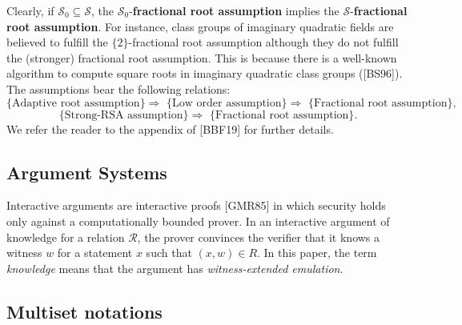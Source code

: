 \documentclass[11pt, lettersize, notitlepage, leqno, footskip=0.6cm]{article}
\newcommand{\imp}{\Longrightarrow}
\newcommand{\mc}{\mathcal}
\newcommand{\sub}{\subseteq}
\newcommand{\vs}{\vspace{-0.15cm}}
\newcommand{\noin}{\noindent}
\newtheorem{Def}{Definition}[section]
\numberwithin{equation}{section}
\begin{document}
Clearly, if $\mc{S}_0\sub \mc{S}$, the $\mc{S}_0$-\textbf{fractional root assumption} implies the $\mc{S}$-\textbf{fractional root assumption}. For instance, class groups of imaginary quadratic fields are believed to fulfill the $\{2\}$-fractional root assumption although they do not fulfill the (stronger) fractional root assumption. This is because there is a well-known algorithm to compute square roots in imaginary quadratic class groups ([BS96]). The assumptions bear the following relations: \vs $$\text{\{Adaptive root assumption\} }\imp \text{ \{Low order assumption\} } \imp \text{ \{Fractional root assumption\} },$$ \vspace{-0.6cm} $$\text{\{Strong-RSA assumption\} }\imp \text{ \{Fractional root assumption\}}. $$ We refer the reader to the appendix of [BBF19] for further details.

\subsection{\fontsize{11}{11}\selectfont Argument Systems }
\begin{comment}

\begin{Def} \normalfont We say an argument system $\protect{(\verb|Pgen,;P,V|)}$ is \textit{sound} if for all PPT adversaries $\mc{A} = (\mc{A}_0, \mc{A}_1)$, the probability of $\mc{A}$ forging a fake proof is negligible.\end{Def}

\begin{Def} \normalfont An argument system is \textit{non-interactive} if it consists of a single round of interaction between the Prover and the Verifier.\end{Def}

\noin \textbf{This subsection needs to be completed}


\end{comment}

Interactive arguments are interactive proofs [GMR85] in which security holds only against a computationally bounded prover. In an interactive argument of knowledge for a relation $\mc{R}$, the prover convinces the verifier that it knows a witness $w$ for a statement $x$ such that $(x,w) \in R$. In this paper, the term \textit{knowledge} means that the argument has \textit{witness-extended emulation}.



\subsection{\fontsize{11}{11}\selectfont Multiset notations}
\end{document}

